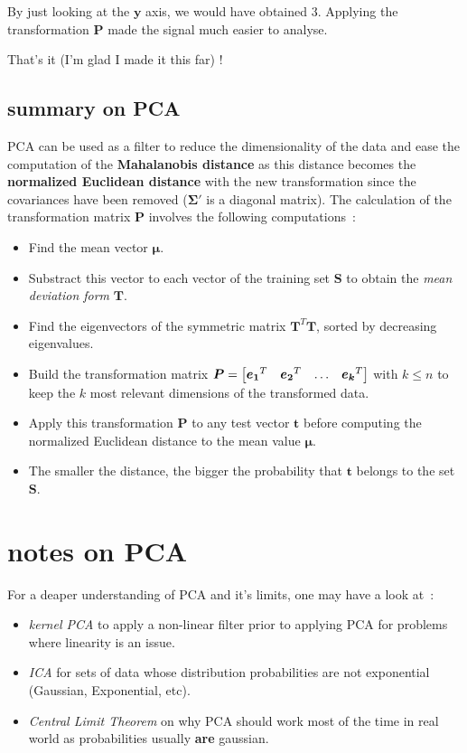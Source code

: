 \documentclass[11pt,twocolumn]{amsart} %
\newcommand{\ve}[1]{\boldsymbol{#1}}
\newcommand{\ma}[1]{\boldsymbol{#1}}
\newenvironment{m}{\begin{bmatrix}}{\end{bmatrix}}
\begin{document}
By just looking at the $\ve{y}$ axis, we would have obtained $3$. Applying the transformation $\ma{P}$ made the signal much easier to analyse.

That's it (I'm glad I made it this far) !

\subsection{summary on PCA}

PCA can be used as a filter to reduce the dimensionality of the data and ease the computation of the \textbf{Mahalanobis distance} as this distance becomes the \textbf{normalized Euclidean distance} with the new transformation since the covariances have been removed ($\ma\Sigma'$ is a diagonal matrix). The calculation of the transformation matrix $\ma{P}$ involves the following computations~:
\begin{itemize}
  \item Find the mean vector $\ve\mu$.
  \item Substract this vector to each vector of the training set $\ma{S}$ to obtain the \emph{mean deviation form} $\ma{T}$.
  \item Find the eigenvectors of the symmetric matrix $\ma{T}^T\ma{T}$, sorted by decreasing eigenvalues.
  \item Build the transformation matrix $\ma{P} = \begin{m}\ve{e_1}^T & \ve{e_2}^T & \hdots & \ve{e_k}^T \end{m}$ with $k \leq n$ to keep the $k$ most relevant dimensions of the transformed data.
  \item Apply this transformation $\ma{P}$ to any test vector $\ve{t}$ before computing the normalized Euclidean distance to the mean value $\ve\mu$.
  \item The smaller the distance, the bigger the probability that $\ve{t}$ belongs to the set $\ma{S}$.
\end{itemize}
\section{notes on PCA}

For a deaper understanding of PCA and it's limits, one may have a look at~:
\begin{itemize}
  \item \emph{kernel PCA} to apply a non-linear filter prior to applying PCA for problems where linearity is an issue.
  \item \emph{ICA} for sets of data whose distribution probabilities are not exponential (Gaussian, Exponential, etc).
  \item \emph{Central Limit Theorem} on why PCA should work most of the time in real world as probabilities usually \textbf{are} gaussian.
\end{itemize}
\end{document}
